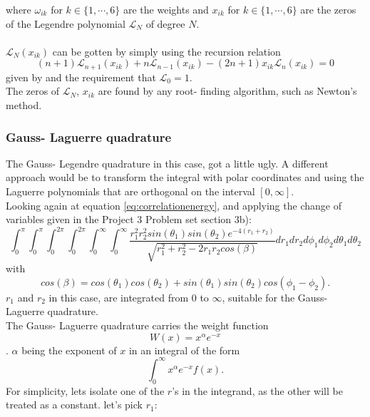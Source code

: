 \documentclass[10pt,a4paper]{article}
\begin{document}
where $\omega_{ik}$ for $k \in\{1,\cdots,6\}$ are the weights and $x_{ik}$ for $k \in\{1,\cdots,6\}$ are the zeros of the Legendre polynomial $\mathcal{L}_N$ of degree $N$.\\\\$\mathcal{L}_N(x_{ik})$ can be gotten by simply using the recursion relation
\begin{equation}
 (n+1)\mathcal{L}_{n+1}(x_{ik})+n\mathcal{L}_{n-1}(x_{ik})-(2n+1)x_{ik}\mathcal{L}_n(x_{ik})=0
\end{equation}
given by \cite{Lecture_Notes_Fall_2015}
and the requirement that $\mathcal{L}_0=1$.\\The zeros of $\mathcal{L}_N$, $x_{ik}$ are found by any root- finding algorithm, such as Newton's method. 
\subsubsection{Gauss- Laguerre quadrature}
The Gauss- Legendre quadrature in this case, got a little ugly. A different approach would be to transform the integral with polar coordinates and using the Laguerre polynomials that are orthogonal on the interval $[0,\infty]$.\\Looking again at equation \ref{eq:correlationenergy}, and applying the change of variables given in the Project 3 Problem set \cite{Problem_set_3} section 3b):
\begin{equation*}
\int_{0}^{\pi}\int_{0}^{\pi}\int_{0}^{2\pi}\int_{0}^{2\pi}\int_{0}^{\infty}\int_{0}^{\infty}
\frac{r_1^2r_2^2sin(\theta_1)sin(\theta_2)e^{-4(r_1+r_2)}}{\sqrt{r_1^2+r_2^2-2r_1r_2cos(\beta)}}dr_1dr_2d\phi_1d\phi_2d\theta_1d\theta_2
\end{equation*}
with
\begin{equation*}
cos(\beta)=cos(\theta_1)cos(\theta_2)+sin(\theta_1)sin(\theta_2)cos(\phi_1-\phi_2).
\end{equation*}
$r_1$ and $r_2$ in this case, are integrated from $0$ to $\infty$, suitable for the Gauss- Laguerre quadrature.\\The Gauss- Laguerre quadrature carries the weight function
\begin{equation}
W(x)=x^\alpha e^{-x}
\end{equation}
\cite{Lecture_Notes_Fall_2015}. $\alpha$ being the exponent of $x$ in an integral of the form
\begin{equation}
\int_0^{\infty}x^{\alpha}e^{-x}f(x).
\end{equation}
For simplicity, lets isolate one of the $r$'s in the integrand, as the other will be treated as a constant. let's pick $r_1$:
\end{document}
